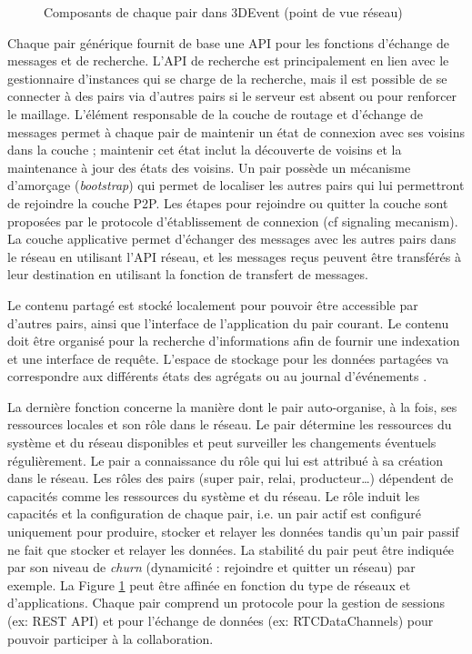 \begin{figure}[ht]
	\centering
	\caption{Composants de chaque pair dans 3DEvent (point de vue réseau)}
	\label{fig:middleware}
\end{figure}


Chaque pair générique fournit de base une \gls{API} pour les fonctions d'échange 
de messages et de recherche. 
L'\gls{API} de recherche est principalement en lien avec le 
gestionnaire d'instances qui se charge de la recherche, mais il est possible de se 
connecter à des pairs via d'autres pairs si le serveur est absent ou pour renforcer 
le maillage.
L'élément responsable de la couche de routage et d'échange de messages permet 
à chaque pair de maintenir un état de connexion avec ses voisins dans la couche 
; maintenir cet état inclut la découverte de voisins et la maintenance  à jour des 
états des voisins.
Un pair possède un mécanisme d'amorçage (\textit{bootstrap}) qui permet de 
localiser les autres pairs qui lui permettront de rejoindre la couche \gls{P2P}. Les 
étapes pour rejoindre ou quitter la couche sont proposées par le protocole 
d'établissement de connexion 
(cf signaling mecanism).
La couche applicative permet d'échanger des messages avec les autres pairs 
dans le réseau en utilisant l'\gls{API} réseau, et les messages reçus peuvent être 
transférés à leur destination en utilisant la fonction de transfert de messages. 

Le contenu partagé est stocké localement pour pouvoir être accessible par d'autres 
pairs, ainsi que l'interface de l'application du pair courant. Le contenu doit être 
organisé pour la recherche d'informations afin de fournir une indexation et une 
interface de requête. 
L'espace de stockage pour les données partagées va correspondre aux différents 
états des agrégats \cite{Desprat2015a,Desprat2015b} ou au journal d'événements 
\cite{Desprat2016,Desprat2017}.


La dernière fonction concerne la manière dont le pair auto-organise, à la fois, ses 
ressources locales et son rôle dans le réseau. Le pair détermine les 
ressources du système et du réseau disponibles et peut surveiller les 
changements éventuels régulièrement.
Le pair a connaissance du rôle qui lui est attribué à sa création dans le réseau. Les 
rôles des pairs (super pair, relai, producteur\dots) dépendent de 
capacités comme les ressources du système et du réseau. Le rôle induit les 
capacités et la configuration de chaque pair, i.e. un pair actif est configuré 
uniquement pour produire, stocker et relayer les données tandis qu'un pair passif ne fait que stocker et relayer les données. La stabilité du pair peut être indiquée par son niveau de 
\textit{churn} (dynamicité : rejoindre et quitter un réseau) par exemple. 
La Figure \ref{fig:middleware} peut être affinée en fonction du type de 
réseaux et d'applications. Chaque pair comprend un protocole pour la gestion
de sessions (ex: REST API) et pour l'échange de données (ex: RTCDataChannels)  
pour pouvoir participer à la collaboration.



